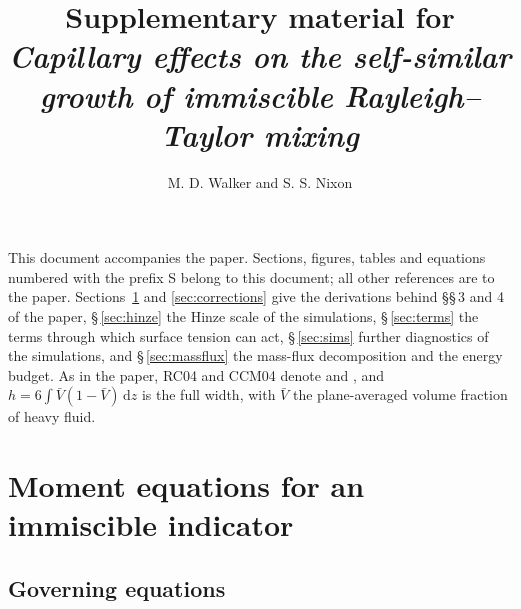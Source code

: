 \documentclass[11pt]{article}
\title{Supplementary material for\\ \textit{Capillary effects on the self-similar growth of immiscible Rayleigh--Taylor mixing}}
\author{M. D. Walker and S. S. Nixon}
\date{}
\begin{document}
\maketitle

This document accompanies the paper. Sections, figures, tables and equations numbered with the prefix S belong to this document; all other references are to the paper. Sections~\ref{sec:moments} and \ref{sec:corrections} give the derivations behind \S\S\,3 and 4 of the paper, \S\,\ref{sec:hinze} the Hinze scale of the simulations, \S\,\ref{sec:terms} the terms through which surface tension can act, \S\,\ref{sec:sims} further diagnostics of the simulations, and \S\,\ref{sec:massflux} the mass-flux decomposition and the energy budget. As in the paper, RC04 and CCM04 denote \citet{Ristorcelli2004} and \citet{Cook2004}, and $h = 6 \int \bar V (1 - \bar V) \, \mathrm d z$ is the full width, with $\bar V$ the plane-averaged volume fraction of heavy fluid.

\section{Moment equations for an immiscible indicator}\label{sec:moments}

\subsection{Governing equations}\label{sec:eqs}
\end{document}
